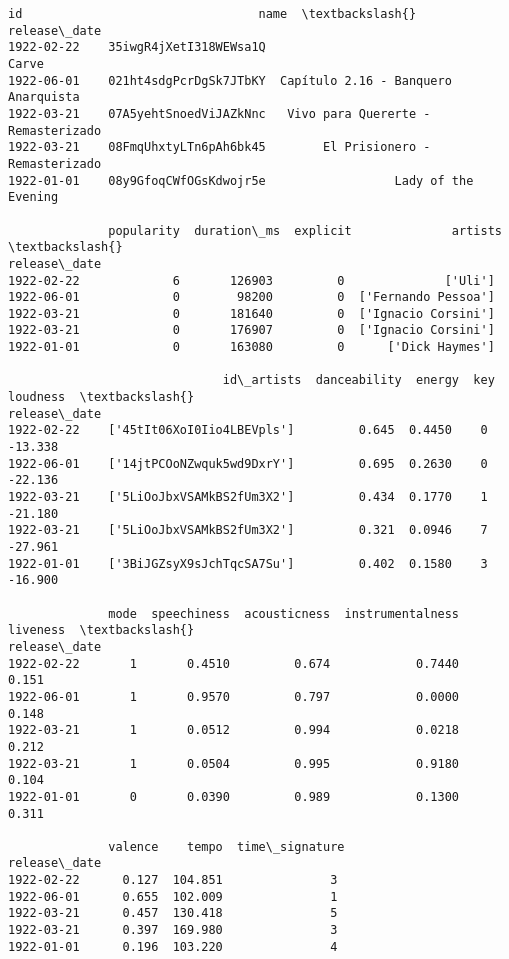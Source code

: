 \documentclass[11pt]{article}
\makeatletter
\newcommand{\boxspacing}{\kern\kvtcb@left@rule\kern\kvtcb@boxsep}
\newcommand{\prompt}[4]{
        {\ttfamily\llap{{\color{#2}[#3]:\hspace{3pt}#4}}\vspace{-\baselineskip}}
    }
\makeatother
\begin{document}
            \begin{tcolorbox}[breakable, size=fbox, boxrule=.5pt, pad at break*=1mm, opacityfill=0]
\prompt{Out}{outcolor}{12}{\boxspacing}
\begin{Verbatim}[commandchars=\\\{\}]
                                  id                                 name  \textbackslash{}
release\_date
1922-02-22    35iwgR4jXetI318WEWsa1Q                                Carve
1922-06-01    021ht4sdgPcrDgSk7JTbKY  Capítulo 2.16 - Banquero Anarquista
1922-03-21    07A5yehtSnoedViJAZkNnc   Vivo para Quererte - Remasterizado
1922-03-21    08FmqUhxtyLTn6pAh6bk45        El Prisionero - Remasterizado
1922-01-01    08y9GfoqCWfOGsKdwojr5e                  Lady of the Evening

              popularity  duration\_ms  explicit              artists  \textbackslash{}
release\_date
1922-02-22             6       126903         0              ['Uli']
1922-06-01             0        98200         0  ['Fernando Pessoa']
1922-03-21             0       181640         0  ['Ignacio Corsini']
1922-03-21             0       176907         0  ['Ignacio Corsini']
1922-01-01             0       163080         0      ['Dick Haymes']

                              id\_artists  danceability  energy  key  loudness  \textbackslash{}
release\_date
1922-02-22    ['45tIt06XoI0Iio4LBEVpls']         0.645  0.4450    0   -13.338
1922-06-01    ['14jtPCOoNZwquk5wd9DxrY']         0.695  0.2630    0   -22.136
1922-03-21    ['5LiOoJbxVSAMkBS2fUm3X2']         0.434  0.1770    1   -21.180
1922-03-21    ['5LiOoJbxVSAMkBS2fUm3X2']         0.321  0.0946    7   -27.961
1922-01-01    ['3BiJGZsyX9sJchTqcSA7Su']         0.402  0.1580    3   -16.900

              mode  speechiness  acousticness  instrumentalness  liveness  \textbackslash{}
release\_date
1922-02-22       1       0.4510         0.674            0.7440     0.151
1922-06-01       1       0.9570         0.797            0.0000     0.148
1922-03-21       1       0.0512         0.994            0.0218     0.212
1922-03-21       1       0.0504         0.995            0.9180     0.104
1922-01-01       0       0.0390         0.989            0.1300     0.311

              valence    tempo  time\_signature
release\_date
1922-02-22      0.127  104.851               3
1922-06-01      0.655  102.009               1
1922-03-21      0.457  130.418               5
1922-03-21      0.397  169.980               3
1922-01-01      0.196  103.220               4
\end{Verbatim}
\end{tcolorbox}
        
\end{document}
